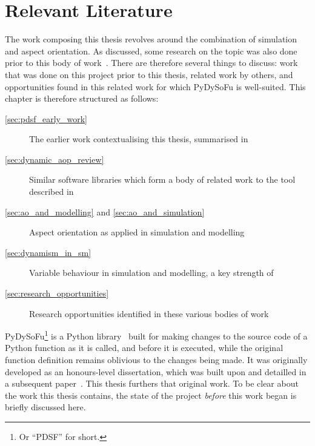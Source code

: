 \chapter{Relevant Literature}

The work composing this thesis revolves around the combination of simulation and
aspect orientation. As discussed, some research on the topic was also done prior
to this body of work~.
There are therefore several things to discuss: work that was done on this
project prior to this thesis, related work by others, and opportunities found in
this related work for which PyDySoFu is well-suited. This chapter is therefore
structured as follows:

\begin{description}
    \item[\cref{sec:pdsf_early_work}] The earlier work contextualising this thesis, summarised in
    \cite{wallis2018caise}
    \item[\cref{sec:dynamic_aop_review}] Similar software libraries which form a body of related work to the
    tool described in \cite{wallis2018caise}
    \item[\cref{sec:ao_and_modelling} and \cref{sec:ao_and_simulation}] Aspect orientation as applied in simulation and modelling
    \item[\cref{sec:dynamism_in_sm}] Variable behaviour in simulation and modelling, a key strength of
    \cite{pdsf_repo}
    \item[\cref{sec:research_opportunities}] Research opportunities identified in these various bodies of work
\end{description}






PyDySoFu\footnote{Or ``PDSF'' for short.} is a Python library~\cite{pdsf_repo}
built for making changes to the source code of a Python function as it is
called, and before it is executed, while the original function definition
remains oblivious to the changes being made. It was originally developed as an
honours-level dissertation, which was built upon and detailled in a subsequent
paper~\cite{wallis2018caise}. This thesis furthers that original work. To be
clear about the work this thesis contains, the state of the project
\emph{before} this work began is briefly discussed here.

